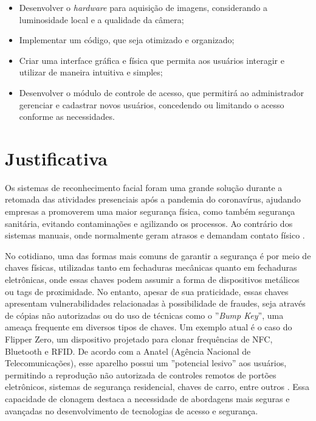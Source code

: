\begin{itemize}
    \item  Desenvolver o \textit{hardware} para aquisição de imagens, considerando a 
    luminosidade local e a qualidade da câmera;
  
    \item Implementar um código, que seja otimizado e organizado; 
    
    \item Criar uma interface gráfica e física que permita aos usuários interagir 
    e utilizar de maneira intuitiva e simples;
    
    \item Desenvolver o módulo de controle de acesso, que permitirá 
    ao administrador gerenciar e cadastrar novos usuários, concedendo ou 
    limitando o acesso conforme as necessidades.
\end{itemize}

\section{Justificativa}\label{sec:justificativa}

Os sistemas de reconhecimento facial foram uma grande solução durante a retomada 
das atividades presenciais após a pandemia do coronavírus, ajudando empresas
a promoverem uma maior segurança física, como também segurança sanitária, 
evitando contaminações e agilizando os processos. Ao contrário dos sistemas 
manuais, onde normalmente geram atrasos e demandam contato físico \cite{terra2020}.

No cotidiano, uma das formas mais comuns de garantir a segurança é por meio de 
chaves físicas, utilizadas tanto em fechaduras mecânicas quanto em fechaduras 
eletrônicas, onde essas chaves podem assumir a forma de dispositivos metálicos 
ou tags de proximidade. No entanto, apesar de sua praticidade, 
essas chaves apresentam vulnerabilidades relacionadas à possibilidade de 
fraudes, seja através de cópias não autorizadas ou do uso de técnicas como 
o ''\textit{Bump Key}'', uma ameaça frequente em diversos tipos de chaves. Um exemplo 
atual é o caso do Flipper Zero, um dispositivo projetado para clonar 
frequências de NFC, Bluetooth e RFID. De acordo com a Anatel (Agência 
Nacional de Telecomunicações), esse aparelho possui um ''potencial lesivo'' 
aos usuários, permitindo a reprodução não autorizada de controles 
remotos de portões eletrônicos, sistemas de segurança residencial, 
chaves de carro, entre outros \cite{anatel2023}. Essa capacidade de clonagem destaca 
a necessidade de abordagens mais seguras e avançadas no desenvolvimento 
de tecnologias de acesso e segurança. 

